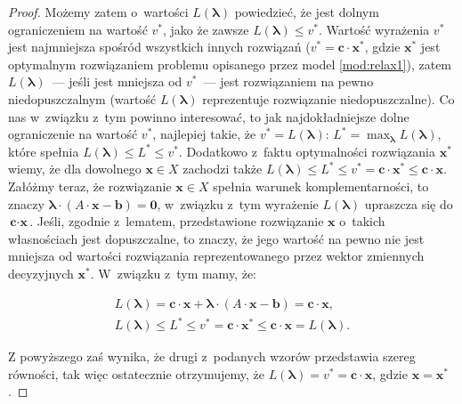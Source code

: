 \begin{proof}
	Możemy zatem o~wartości $L \left( \boldsymbol{\lambda} \right)$ powiedzieć, że jest dolnym ograniczeniem na wartość $v^{\ast}$, jako że zawsze $L \left( \boldsymbol{\lambda} \right) \leqslant v^{\ast}$.
	Wartość wyrażenia $v^{\ast}$ jest najmniejsza spośród wszystkich innych rozwiązań ($v^{\ast} = \textbf{c} \cdot \textbf{x}^{\ast}$, gdzie $\textbf{x}^{\ast}$ jest optymalnym rozwiązaniem problemu opisanego przez model \ref{mod:relax1}), zatem $L \left( \boldsymbol{\lambda} \right)$~--- jeśli jest mniejsza od $v^{\ast}$~--- jest rozwiązaniem na pewno niedopuszczalnym (wartość $L \left( \boldsymbol{\lambda} \right)$ reprezentuje rozwiązanie niedopuszczalne).
	Co nas w~związku z~tym powinno interesować, to jak najdokładniejsze dolne ograniczenie na wartość $v^{\ast}$, najlepiej takie, że $v^{\ast} = L \left( \boldsymbol{\lambda} \right)$: $L^{\ast} = \max_{\boldsymbol{\lambda}} L \left( \boldsymbol{\lambda} \right)$, które spełnia $L \left( \boldsymbol{\lambda} \right) \leqslant L^{\ast} \leqslant v^{\ast}$.
	Dodatkowo z~faktu optymalności rozwiązania $\textbf{x}^{\ast}$ wiemy, że dla dowolnego $\textbf{x} \in X$ zachodzi także $L \left( \boldsymbol{\lambda} \right) \leqslant L^{\ast} \leqslant v^{\ast} = \textbf{c} \cdot \textbf{x}^{\ast} \leqslant \textbf{c} \cdot \textbf{x}$.
	Załóżmy teraz, że rozwiązanie $\textbf{x} \in X$ spełnia warunek komplementarności, to znaczy $\boldsymbol{\lambda} \cdot \left( A \cdot \textbf{x} - \textbf{b} \right) = \textbf{0}$, w~związku z~tym wyrażenie $L \left( \boldsymbol{\lambda} \right)$ upraszcza się do $\textbf{c} \cdot \textbf{x}$.
	Jeśli, zgodnie z~lematem, przedstawione rozwiązanie $\textbf{x}$ o~takich własnościach jest dopuszczalne, to znaczy, że jego wartość na pewno nie jest mniejsza od wartości rozwiązania reprezentowanego przez wektor zmiennych decyzyjnych $\textbf{x}^{\ast}$. W~związku z~tym mamy, że:
	
	\begin{gather}
		L \left( \boldsymbol{\lambda} \right) = \textbf{c} \cdot \textbf{x} + \boldsymbol{\lambda} \cdot \left( A \cdot \textbf{x} - \textbf{b} \right) = \textbf{c} \cdot \textbf{x}\text{,}\\
		L \left( \boldsymbol{\lambda} \right) \leqslant L^{\ast} \leqslant v^{\ast} = \textbf{c} \cdot \textbf{x}^{\ast} \leqslant \textbf{c} \cdot \textbf{x} = L \left( \boldsymbol{\lambda} \right)\text{.}
	\end{gather}
	
	Z powyższego zaś wynika, że drugi z~podanych wzorów przedstawia szereg równości, tak więc ostatecznie otrzymujemy, że $L \left( \boldsymbol{\lambda} \right) = v^{\ast} = \textbf{c} \cdot \textbf{x}$, gdzie $\textbf{x} = \textbf{x}^{\ast}$.
\end{proof}

